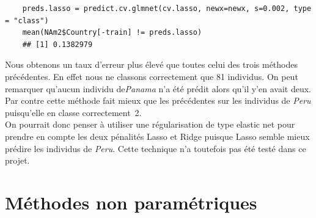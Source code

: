\documentclass[12pt,a4paper]{article}
\begin{document}
\begin{lstlisting}
	preds.lasso = predict.cv.glmnet(cv.lasso, newx=newx, s=0.002, type = "class")
	mean(NAm2$Country[-train] != preds.lasso)
	## [1] 0.1382979
\end{lstlisting}
Nous obtenons un taux d'erreur plus élevé que toutes celui des trois méthodes
précédentes. En effet nous ne classons correctement que 81 individus. On peut
remarquer qu'aucun individu de\textit{Panama} n'a été prédit alors qu'il y'en avait deux. Par contre cette
méthode fait mieux que les précédentes sur les individus de \textit{Peru}
puisqu'elle en classe correctement~2.\vspace{3mm}\\
On pourrait donc penser à utiliser une régularisation de type \og elastic net \fg pour prendre en compte les deux pénalités Lasso et Ridge puisque Lasso semble mieux prédire les individus de \textit{Peru}. Cette technique n'a toutefois pas été testé dans ce projet.
\section{Méthodes non paramétriques}
\end{document}
